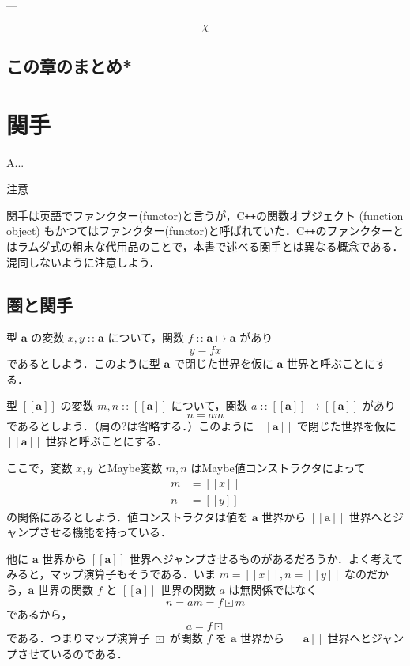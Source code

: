 \documentclass[a4paper]{jsbook}
\def\[{\left[\!\left[}
\def\]{\right]\!\right]}
\newcommand{\programminglanguage}[1]{\textsf{#1}}
\newcommand{\cxx}{\programminglanguage{C}\texttt{++}}
\newenvironment{leader}{\begingroup}{\endgroup}
\newenvironment{caution}{\begin{boxnote}\begin{center}注意\end{center}}{\end{boxnote}}
\newcommand{\mType}[1]{\mathbf{#1}}
\newcommand{\mMaybeType}[1]{\[\mType{#1}\]}
\newcommand{\mMaybeWith}[1]{\[#1\]}
\DeclareMathOperator{\mIn}{{:\!:}}
\DeclareMathOperator{\mMapsTo}{\mapsto}
\DeclareMathOperator{\mMapMaybe}{\boxdot}
\newcommand{\mProjection}[2]{#1\mMapsTo#2}
\begin{document}
---

$$\chi$$

\section*{この章のまとめ*}

\chapter{関手}
\label{ch:functor}

\begin{leader}
A...
\end{leader}

\begin{caution}
関手は英語でファンクター(functor)と言うが，\cxx の関数オブジェクト (function object) もかつてはファンクター(functor)と呼ばれていた．\cxx のファンクターとはラムダ式の粗末な代用品のことで，本書で述べる関手とは異なる概念である．混同しないように注意しよう．
\end{caution}


\section{圏と関手}

型 $\mType{a}$ の変数 $x,y\mIn\mType{a}$ について，関数 $f\mIn\mProjection{\mType{a}}{\mType{a}}$ があり
\begin{equation}
y=fx
\end{equation}
であるとしよう．このように型 $\mType{a}$ で閉じた世界を仮に $\mType{a}$ 世界と呼ぶことにする．

型 $\mMaybeType{a}$ の変数 $m,n\mIn\mMaybeType{a}$ について，関数 $a\mIn\mProjection{\mMaybeType{a}}{\mMaybeType{a}}$ があり
\begin{equation}
n=am
\end{equation}
であるとしよう．（肩の?は省略する．）このように $\mMaybeType{a}$ で閉じた世界を仮に $\mMaybeType{a}$ 世界と呼ぶことにする．

ここで，変数 $x,y$ とMaybe変数 $m,n$ はMaybe値コンストラクタによって
\begin{align}
m&=\mMaybeWith{x}\\
n&=\mMaybeWith{y}
\end{align}
の関係にあるとしよう．値コンストラクタは値を $\mType{a}$ 世界から $\mMaybeType{a}$ 世界へとジャンプさせる機能を持っている．

他に $\mType{a}$ 世界から $\mMaybeType{a}$ 世界へジャンプさせるものがあるだろうか．よく考えてみると，マップ演算子もそうである．いま $m=\mMaybeWith{x},n=\mMaybeWith{y}$ なのだから，$\mType{a}$ 世界の関数 $f$ と $\mMaybeType{a}$ 世界の関数 $a$ は無関係ではなく
\begin{equation}
n=am=f\mMapMaybe m
\end{equation}
であるから，
\begin{equation}
a=f\mMapMaybe
\end{equation}
である．つまりマップ演算子 $\mMapMaybe$ が関数 $f$ を $\mType{a}$ 世界から $\mMaybeType{a}$ 世界へとジャンプさせているのである．
\end{document}

